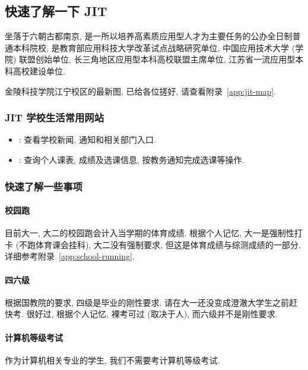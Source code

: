 \documentclass{jit-qut}
\begin{document}



\newpage
\subsection{快速了解一下 JIT}

 坐落于六朝古都南京, 是一所以培养高素质应用型人才为主要任务的公办全日制普通本科院校, 是教育部应用科技大学改革试点战略研究单位, 中国应用技术大学 (学院) 联盟创始单位, 长三角地区应用型本科高校联盟主席单位, 江苏省一流应用型本科高校建设单位.

金陵科技学院江宁校区的最新图, 已给各位搓好, 请查看附录~\ref{app:jit-map}. 


\subsubsection{JIT 学校生活常用网站}

\begin{itemize}[itemsep=0.1em,topsep=0.25em,parsep=0pt,partopsep=0pt]
 \item {}: 查看学校新闻, 通知和相关部门入口.
 \item {}: 查询个人课表, 成绩及选课信息, 按教务通知完成选课等操作.
\end{itemize}

\subsubsection{快速了解一些事项}

\paragraph{校园跑} 目前大一, 大二的校园跑会计入当学期的体育成绩. 根据个人记忆, 大一是强制性打卡 (不跑体育课会挂科), 大二没有强制要求, 但这是体育成绩与综测成绩的一部分. 详细参考附录~\ref{app:school-running}.
\paragraph{四六级} 根据国教院的要求, 四级是毕业的刚性要求. 请在大一还没变成澄澈大学生之前赶快考. 很好过, 根据个人记忆, 裸考可过 (取决于人), 而六级并不是刚性要求.
\paragraph{计算机等级考试} 作为计算机相关专业的学生, 我们不需要考计算机等级考试.
\end{document}
